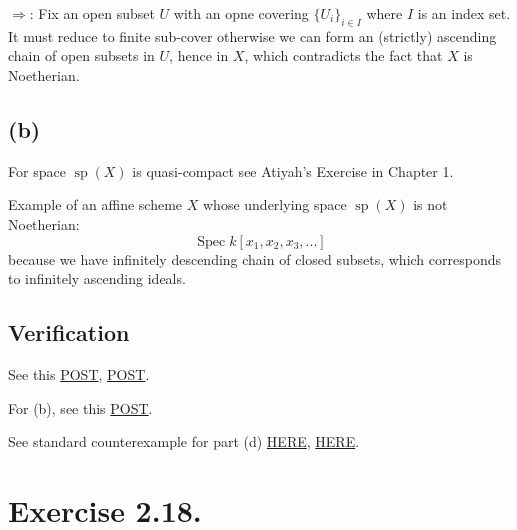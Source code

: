 $\Rightarrow$: Fix an open subset $U$ with an opne covering $\{U_i\}_{i\in I}$ where $I$ is an index set. It must reduce to finite sub-cover otherwise we can form an (strictly) ascending chain of open subsets in $U$, hence in $X$, which contradicts the fact that $X$ is Noetherian. 

\subsection{(b)}

For space $\operatorname{sp}(X)$ is quasi-compact see Atiyah's Exercise in Chapter 1. 

Example of an affine scheme $X$ whose underlying space $\operatorname{sp}(X)$ is not Noetherian: 
\[\operatorname{Spec}k[x_1,x_2,x_3,...]\] because we have infinitely descending chain of closed subsets, which corresponds to infinitely ascending ideals. 


\subsection{Verification}

See this \href{https://math.stackexchange.com/questions/1442665/a-noetherian-topological-space-is-compact}{POST}, \href{https://math.stackexchange.com/questions/2745543/v-is-noetherian-space-if-only-if-every-open-subset-of-v-is-compact}{POST}.

For (b), see this \href{https://math.stackexchange.com/questions/4690764/is-this-space-noetherian}{POST}.

See standard counterexample for part (d) \href{https://math.stackexchange.com/questions/1611732/example-of-non-noetherian-ring-whose-spectrum-is-noetherian/1611757#1611757}{HERE}, \href{https://math.stackexchange.com/questions/7392/a-non-noetherian-ring-with-noetherian-spectrum}{HERE}.

\section{Exercise 2.18.}

